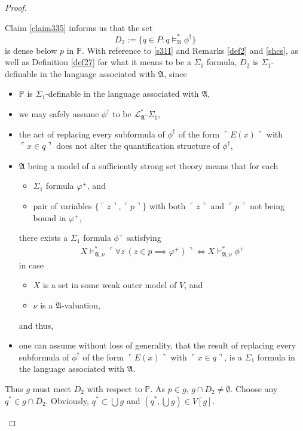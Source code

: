 \documentclass[12pt, twoside]{memoir}
\numberwithin{equation}{section}
\theoremstyle{definition}
\theoremstyle{remark}
\theoremstyle{definition}
\theoremstyle{definition}
\theoremstyle{definition}
\theoremstyle{remark}
\begin{document}
\begin{proof}
\begin{enumerate}[label=Case \arabic*:, leftmargin=50pt]
    Claim \ref{claim335} informs us that the set $$D_2 := \{q \in P : q \models^{*}_{\mathfrak{A}} \phi^{\dagger}\}$$ is dense below $p$ in $\mathbb{P}$. With reference to \ref{s31I} and Remarks \ref{def2} and \ref{shcs}, as well as Definition \ref{def27} for what it means to be a $\Sigma_1$ formula, $D_2$ is $\Sigma_1$-definable in the language associated with $\mathfrak{A}$, since
    \begin{itemize}
        \item $\mathbb{P}$ is $\Sigma_1$-definable in the language associated with $\mathfrak{A}$,
        \item we may safely assume $\phi^{\dagger}$ to be $\mathcal{L}^{*}_{\mathfrak{A}}$-$\Sigma_1$,
        \item the act of replacing every subformula of $\phi^{\dagger}$ of the form $\ulcorner E(x) \urcorner$ with $\ulcorner x \in q \urcorner$ does not alter the quantification structure of $\phi^{\dagger}$,
        \item $\mathfrak{A}$ being a model of a sufficiently strong set theory means that for each 
        \begin{itemize}[label=$\circ$]
            \item $\Sigma_1$ formula $\varphi^+$, and
            \item pair of variables $\{\ulcorner z \urcorner, \ulcorner p \urcorner\}$ with both $\ulcorner z \urcorner$ and $\ulcorner p \urcorner$ not being bound in $\varphi^+$,
        \end{itemize}
        there exists a $\Sigma_1$ formula $\phi^+$ satisfying
        \begin{align*}
            X \models^*_{\mathfrak{A}, \nu} \ulcorner \forall z \ (z \in p \implies \varphi^+) \urcorner \iff X \models^*_{\mathfrak{A}, \nu} \phi^+
        \end{align*}
        in case 
        \begin{itemize}[label=$\circ$]
            \item $X$ is a set in some weak outer model of $V$, and
            \item $\nu$ is a $\mathfrak{A}$-valuation, 
        \end{itemize}
        and thus,
        \item one can assume without loss of generality, that the result of replacing every subformula of $\phi^{\dagger}$ of the form $\ulcorner E(x) \urcorner$ with $\ulcorner x \in q \urcorner$, is a $\Sigma_1$ formula in the language associated with $\mathfrak{A}$.
    \end{itemize}
    Thus $g$ must meet $D_2$ with respect to $\mathbb{P}$. As $p \in g$, $g \cap D_2 \neq \emptyset$. Choose any $q^* \in g \cap D_2$. Obviously, $q^* \subset \bigcup g$ and $(q^*, \bigcup g) \in V[g]$.


\end{enumerate}
\end{proof}
\end{document}
